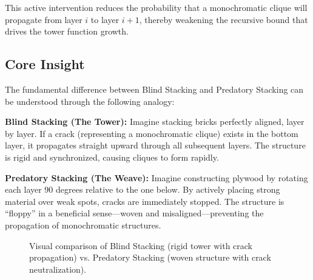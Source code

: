 \documentclass[12pt]{article}
\begin{document}
This active intervention reduces the probability that a monochromatic clique will propagate from layer $i$ to layer $i+1$, thereby weakening the recursive bound that drives the tower function growth.

\subsection{Core Insight}
The fundamental difference between Blind Stacking and Predatory Stacking can be understood through the following analogy:

\textbf{Blind Stacking (The Tower):} Imagine stacking bricks perfectly aligned, layer by layer. If a crack (representing a monochromatic clique) exists in the bottom layer, it propagates straight upward through all subsequent layers. The structure is rigid and synchronized, causing cliques to form rapidly.

\textbf{Predatory Stacking (The Weave):} Imagine constructing plywood by rotating each layer 90 degrees relative to the one below. By actively placing strong material over weak spots, cracks are immediately stopped. The structure is ``floppy'' in a beneficial sense—woven and misaligned—preventing the propagation of monochromatic structures.

\begin{figure}[h]
\centering
{}
\caption{Visual comparison of Blind Stacking (rigid tower with crack propagation) vs. Predatory Stacking (woven structure with crack neutralization).}
\label{fig:comparison}
\end{figure}
\end{document}
